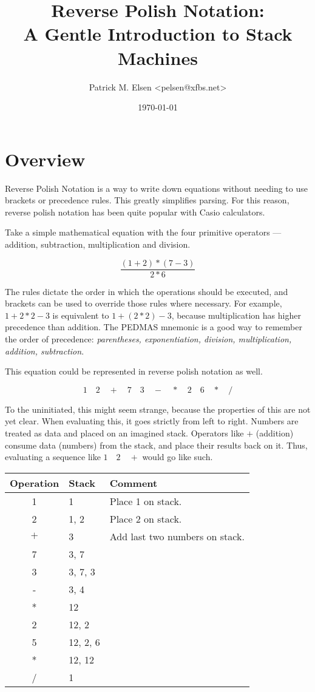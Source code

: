 \documentclass[a4paper,twocolumn]{article}
\title{Reverse Polish Notation:\\A Gentle Introduction to Stack Machines}
\author{Patrick M. Elsen <pelsen@xfbs.net>}
\date{\today}
\begin{document}
\maketitle
\tableofcontents

\section{Overview}

Reverse Polish Notation is a way to write down equations without needing to use brackets or precedence rules. This greatly simplifies parsing. For this reason, reverse polish notation has been quite popular with Casio calculators.

Take a simple mathematical equation with the four primitive operators — addition, subtraction, multiplication and division.

\begin{equation}
  \frac{(1 + 2) * (7 - 3)}{2 * 6}
\end{equation}

The rules dictate the order in which the operations should be executed, and brackets can be used to override those rules where necessary. For example, $1 + 2 * 2 - 3$ is equivalent to $1 + (2 * 2) - 3$, because multiplication has higher precedence than addition. The PEDMAS mnemonic is a good way to remember the order of precedence: \emph{parentheses, exponentiation, division, multiplication, addition, subtraction}. 

This equation could be represented in reverse polish notation as well.

\begin{equation}
1\quad2\quad+\quad7\quad3\quad-\quad*\quad2\quad6\quad*\quad/  
\end{equation}

To the uninitiated, this might seem strange, because the properties of this are not yet clear. When evaluating this, it goes strictly from left to right. Numbers are treated as data and placed on an imagined stack. Operators like $+$ (addition) consume data (numbers) from the stack, and place their results back on it. Thus, evaluating a sequence like $1\quad2\quad+$ would go like such.

\begin{table}[h!]
\begin{tabular}{@{}clp{4cm}@{}}
\toprule
Operation & Stack & Comment\\
\midrule
1 & 1 & Place 1 on stack.\\
2 & 1, 2 & Place 2 on stack.\\
$+$ & 3 & Add last two numbers on stack.\\
7 & 3, 7\\
3 & 3, 7, 3\\
- & 3, 4\\
* & 12\\
2 & 12, 2\\
5 & 12, 2, 6\\
* & 12, 12\\
/ & 1\\
\bottomrule  
\end{tabular}
\end{table}
\end{document}
